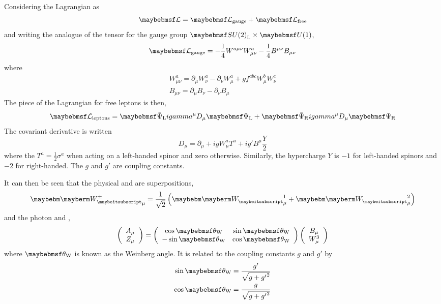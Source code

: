 Considering the Lagrangian as
\begin{equation}
\lagrangiand = \lagrangiand_{\textrm{gauge}} + \lagrangiand_{\textrm{free}}
\end{equation}
and writing the analogue of the tensor \Fmunu for the gauge group
$\SUtwo_{\textrm{L}}\times\Uone$,
\begin{equation}
\lagrangiand_{\textrm{gauge}} = -\frac{1}{4} W^{a\mu\nu} W^a_{\mu\nu}
-\frac{1}{4} B^{\mu\nu}B_{\mu\nu}
\end{equation}
where
\begin{eqnarray*}
W^{a}_{\mu\nu} = \partial_{\mu} W^a_{\nu} - \partial_{\nu}W^a_{\mu} + g f^{abc}
W^{b}_{\mu} W^c_{\nu}\\
B_{\mu\nu} = \partial_{\mu} B_{\nu} - \partial_{\nu} B_{\mu}
\end{eqnarray*}
The piece of the Lagrangian for free leptons is then,
\begin{equation}
\lagrangiand_{\textrm{leptons}} = \APsiL i \gamma^{\mu} D_{\mu} \PsiL + \APsiR i
\gamma^{\mu} D_{\mu} \PsiR
\end{equation}
The covariant derivative is written
\begin{equation}
D_{\mu} = \partial_{\mu} + i g W^a_{\mu} T^a + i g' B^{\mu}\frac{Y}{2}
\end{equation}
where the $T^a = \frac{1}{2}\sigma^a$ when acting on a left-handed spinor and
zero otherwise. Similarly, the hypercharge $Y$ is $-1$ for left-handed spinors
and $-2$ for right-handed. The $g$ and $g'$ are coupling constants.

It can then be seen that the physical \PWp and \PWm are superpositions,
\begin{equation}
\PWpm_{\mu} = \frac{1}{\sqrt{2}}\left(\PW^1_{\mu} + \PW^2_{\mu}\right)
\end{equation}
and the photon and \PZ,
\begin{equation}
\left(\begin{array}{c}A_{\mu} \\ Z_{\mu} \end{array}\right ) =
  \left ( \begin{array}{cc} \cos\thetaw & \sin\thetaw \\ -\sin\thetaw &
      \cos\thetaw\end{array}\right)
\left ( \begin{array}{c} B_{\mu} \\ W^3_{\mu} \end{array} \right )
\end{equation}
where $\thetaw$ is known as the Weinberg angle. It is related to the coupling
constants $g$ and $g'$ by
\begin{eqnarray}
\sin\thetaw = \frac{g'}{\sqrt{g + {g'}^2}} \\
\cos\thetaw = \frac{g}{\sqrt{g + {g'}^2}}
\end{eqnarray}

